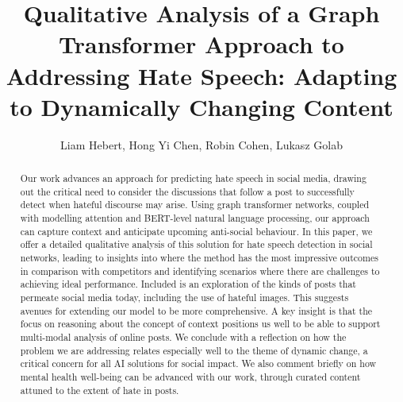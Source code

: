 \documentclass[letterpaper]{article} %
\title{Qualitative Analysis of a Graph Transformer Approach to Addressing Hate Speech:
Adapting to Dynamically Changing Content}
\author{
Liam Hebert,
Hong Yi Chen,
Robin Cohen,
Lukasz Golab
}
\begin{document}
\maketitle

\begin{abstract}
Our work advances an approach for predicting hate speech in social media, drawing out the critical need to consider the discussions that follow a post to successfully detect when hateful discourse may arise. Using graph transformer networks, coupled with modelling attention and BERT-level natural language processing, our approach can capture context and anticipate upcoming anti-social behaviour. In this paper, we offer a detailed qualitative analysis of this solution for hate speech detection in social networks, leading to insights into where the method has the most impressive outcomes in comparison with competitors and identifying scenarios where there are challenges to achieving ideal performance. Included is an exploration of the kinds of posts that permeate social media today, including the use of hateful images. This suggests avenues for extending our model to be more comprehensive. A key insight is that the focus on reasoning about the concept of context positions us well to be able to support multi-modal analysis of online posts. We conclude with a reflection on how the problem we are addressing relates especially well to the theme of dynamic change, a critical concern for all AI solutions for social impact. We also comment briefly on how mental health well-being can be advanced with our work, through curated content attuned to the extent of hate in posts.
\end{abstract}
\end{document}

